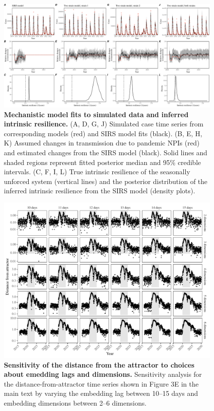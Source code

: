 \documentclass[12pt]{article}
\begin{document}
\begin{figure}[!th]
\includegraphics[width=\textwidth]{../figure_fit/figure_fit.pdf}
\caption{
\textbf{Mechanistic model fits to simulated data and inferred intrinsic resilience.}
(A, D, G, J) Simulated case time series from corresponding models (red) and SIRS model fits (black).
(B, E, H, K) Assumed changes in transmission due to pandemic NPIs (red) and estimated changes from the SIRS model (black).
Solid lines and shaded regions represent fitted posterior median and 95\% credible intervals.
(C, F, I, L) True intrinsic resilience of the seasonally unforced system (vertical lines) and the posterior distribution of the inferred intrinsic resilience from the SIRS model (density plots).
}
\end{figure}


\pagebreak

\begin{figure}[!th]
\includegraphics[width=\textwidth]{../figure3/figure3_sens.pdf}
\caption{
\textbf{Sensitivity of the distance from the attractor to choices about emedding lags and dimensions.}
Sensitivity analysis for the distance-from-attractor time series shown in Figure 3E in the main text by varying the embedding lag between 10--15 days and embedding dimensions between 2--6 dimensions.
}
\end{figure}
\end{document}
